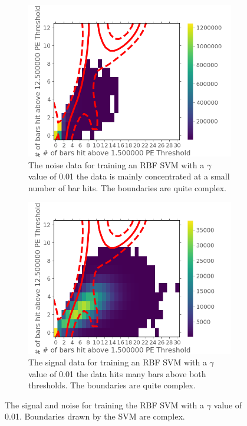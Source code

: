 \begin{figure}[H]
\centering
\begin{subfigure}{.5\textwidth}
  \centering
  \includegraphics[width=\linewidth]{Chapter4/Figs/Raster/svmLinAndRbf/noiseNeutronRbfSVMg0.01.png}
  \captionsetup{width=.9\linewidth}
  \caption{The noise data for training an RBF SVM with a $\gamma$ value of 0.01 the data is mainly concentrated at a small number of bar hits. The boundaries are quite complex.}
  \label{subFig:noiseNeutronRbfSVMg0.01}
\end{subfigure}%
\begin{subfigure}{.5\textwidth}
  \centering
  \includegraphics[width=\linewidth]{Chapter4/Figs/Raster/svmLinAndRbf/signalNeutronRbfSVMg0.01.png}
  \captionsetup{width=.9\linewidth}
  \caption{The signal data for training an RBF SVM with a $\gamma$ value of 0.01 the data hits many bars above both thresholds. The boundaries are quite complex.}
  \label{subFig:signalNeutronRbfSVMg0.01}
\end{subfigure}
\caption{The signal and noise for training the RBF SVM with a $\gamma$ value of 0.01. Boundaries drawn by the SVM are complex.}
\label{fig:signalAndNoiseNeutronRbfSVMg0.01}
\end{figure}

